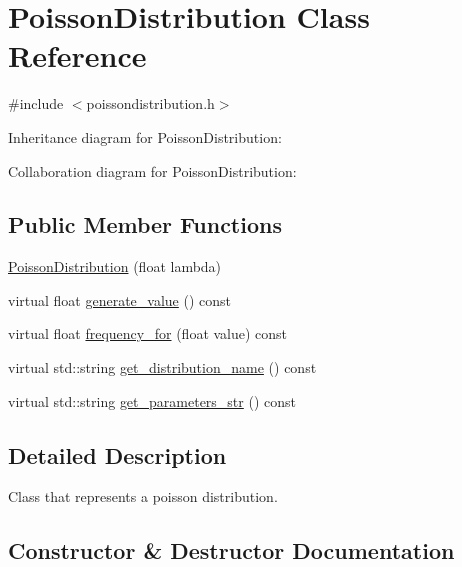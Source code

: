 \hypertarget{classPoissonDistribution}{}\section{Poisson\+Distribution Class Reference}
\label{classPoissonDistribution}


{\ttfamily \#include $<$poissondistribution.\+h$>$}



Inheritance diagram for Poisson\+Distribution\+:


Collaboration diagram for Poisson\+Distribution\+:
\subsection*{Public Member Functions}
\begin{DoxyCompactItemize}
\item 
\hyperlink{classPoissonDistribution_a007e64ef8a5292b4932a2f47b3459ab2}{Poisson\+Distribution} (float lambda)
\item 
virtual float \hyperlink{classPoissonDistribution_ab9c01eabf7c125677da2dc56d23e4212}{generate\+\_\+value} () const
\item 
virtual float \hyperlink{classPoissonDistribution_a48783969aa40f3d9549a9db51ca1c97a}{frequency\+\_\+for} (float value) const
\item 
virtual std\+::string \hyperlink{classPoissonDistribution_a2c6ac9d330241badbdeadc065ad47c1e}{get\+\_\+distribution\+\_\+name} () const
\item 
virtual std\+::string \hyperlink{classPoissonDistribution_a48e471c3bcae5b197a576f61777e67f3}{get\+\_\+parameters\+\_\+str} () const
\end{DoxyCompactItemize}


\subsection{Detailed Description}
Class that represents a poisson distribution. 

\subsection{Constructor \& Destructor Documentation}
\mbox{\label{classPoissonDistribution_a007e64ef8a5292b4932a2f47b3459ab2}} 
